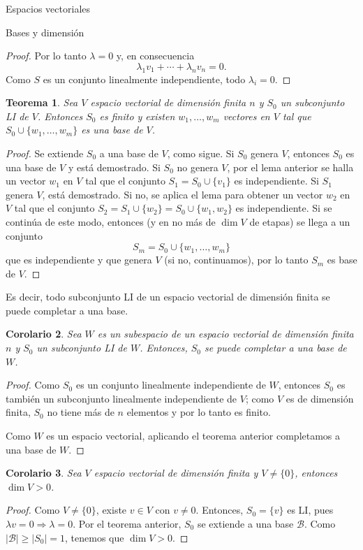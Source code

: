\documentclass[a4paper,12pt,twoside,spanish,reqno]{amsbook}
\numberwithin{equation}{section}
\newtheorem{teorema}{Teorema}[section]
\newtheorem{corolario}[teorema]{Corolario}
\theoremstyle{definition}
\theoremstyle{remark}
\begin{document}
\begin{chapter}{Espacios vectoriales}
\begin{section}{Bases y dimensión}
\begin{proof}
        Por  lo tanto $\lambda =0$ y, en consecuencia  
        $$
        \lambda_1 v_1 + \cdots + \lambda_n v_n =0.
        $$ 
        Como $S$ es un conjunto linealmente independiente, todo $\lambda_i = 0$. 
    \end{proof}



    \begin{teorema}\label{completar-bases}
    Sea $V$ espacio vectorial de dimensión finita $n$ y $S_0$ un subconjunto LI de $V$. Entonces $S_0$  es finito  y existen $w_1,\ldots,w_m$ vectores en  $V$ tal que  $S_0 \cup \{w_1,\ldots,w_m\}$ es una base de $V$. 
\end{teorema}
\begin{proof}
    Se extiende $S_0$ a una base de $V$, como sigue. Si $S_0$ genera $V$, entonces $S_0$ es una base de $V$ y está demostrado. Si $S_0$ no genera $V$, por el lema anterior se halla un vector $w_1$ en $V$ tal que el conjunto $S_1 = S_0 \cup \{v_1\}$ es independiente.			
    Si $S_1$ genera $V$, está demostrado. Si no, se aplica el lema para obtener un vector $w_2$ en $V$ tal que el conjunto $S_2 = S_1 \cup \{w_2\} = S_0 \cup \{w_1,w_2\}$ es independiente. Si se continúa de este modo, entonces (y en no más de $\dim V$ de etapas) se llega a un conjunto 
    $$
    S_m =  S_0 \cup \{w_1,\ldots,w_m\}
    $$
    que es independiente y que genera $V$ (si no, continuamos), por lo tanto $S_m$ es base de $V$. 
\end{proof}

Es decir, todo subconjunto LI de un espacio vectorial de dimensión finita se puede completar a una base.  

    \begin{corolario}
        Sea $W$ es un subespacio de un espacio vectorial de dimensión finita $n$ y $S_0$ un subconjunto LI de $W$. Entonces, $S_0$ se puede completar a una base de $W$. 
    \end{corolario}
    \begin{proof}
        Como $S_0$ es un conjunto linealmente independiente de $W$, entonces $S_0$ es también un subconjunto linealmente independiente de $V$; como $V$ es de dimensión finita, $S_0$ no tiene más de $n$ elementos y por lo tanto es finito.
        
        Como $W$ es un espacio vectorial, aplicando el teorema anterior completamos a una base de $W$. 
    \end{proof}

    \begin{corolario}
        Sea $V$ espacio vectorial de dimensión finita y $V \ne \{0\}$, entonces $\dim V >0$.
    \end{corolario}
    \begin{proof}
        Como $V \ne \{0\}$,  existe $v \in V$ con $v \ne 0$. Entonces, $S_0 = \{v\}$ es LI, pues $\lambda v =0 \Rightarrow \lambda =0$. Por el teorema anterior, $S_0$ se extiende a una base $\mathcal B$. Como $|\mathcal B| \ge |S_0| =1$, tenemos que $\dim V >0$.    
    \end{proof}
    

\end{section}
\end{chapter}
\end{document}
